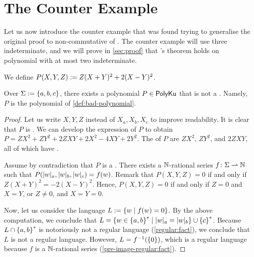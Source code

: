 \documentclass[sigconf,natbib=false,screen, review,anonymous]{acmart}
\begin{document}
\section{The Counter Example}
\label{sec:c-example}

Let us now introduce the counter example that was found trying to generalise
the original proof to non-commutative  of
. The counter example will use three indeterminate, and
we will prove in \cref{sec:proof} that \citeauthor{KARH77}’s theorem holds on
polynomial with at most two indeterminate.

\begin{definition}
    \label{def:bad-polynomial}
    We define $P(X,Y,Z) \mathrel{:=} Z (X + Y)^2 + 2 (X - Y)^2$.
\end{definition}

\begin{theorem}
    \label{thm:counter-example}
    Over $\Sigma \mathrel{:=} \mathopen{\{} a,b,c \mathclose{\}}$,
    there exists a polynomial $P \in \mathsf{PolyKu}$ that is not
    a . Namely,
    $P$ is the polynomial of \cref{def:bad-polynomial}.
\end{theorem}
\begin{proof}
    Let us write $X,Y,Z$ instead of $X_a, X_b, X_c$ to improve
    readability.
    It is clear that $P$ is . We can develop
    the expression of $P$ to 
    obtain
    $P = ZX^2 + ZY^2 + 2ZXY + 2X^2 -4XY + 2Y^2$.
    The  of $P$
    are $ZX^2$, $ZY^2$, and $2ZXY$, all of which have
    .

    Assume by contradiction that $P$ is a .
    There exists a 
    $\mathbb{N}$-rational series $f \colon \Sigma \rightharpoonup \mathbb{N}$
    such that $P(\card[a]{w}, \card[b]{w}, \card[c]{w}) = f(w)$.
    Remark that $P(X,Y,Z) = 0$
    if and only if $Z(X+Y)^2 = -2 (X-Y)^2$. Hence,
    $P(X,Y,Z)=0$ if and only if $Z = 0$ and $X = Y$, or 
    $Z \neq 0$, and $X = Y = 0$.

    Now, let us consider the language $L \mathrel{:=} \mathopen{\{} w \mid  f(w) = 0 \mathclose{\}}$. By the
    above computation, we conclude that $L = \setof{ w \in \set{a,b}^* }{
    \card[a]{w} = \card[b]{w} } \cup \set{ c }^*$.
    Because $L \cap \mathopen{\{} a,b \mathclose{\}}^*$ is notoriously not a regular language
    (\cref{regular:fact}), we
    conclude that $L$ is not a regular language.
    However, $L = f^{-1}(\mathopen{\{} 0 \mathclose{\}})$, which is a regular language
    because $f$ is a $\mathbb{N}$-rational series
    (\cref{pre-image-regular:fact}).
\end{proof}
\end{document}
